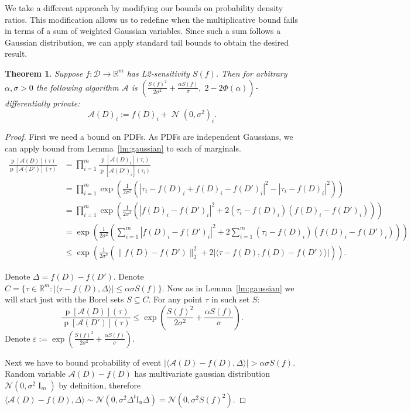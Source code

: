 \documentclass[12pt,letterpaper]{article}
\newcommand{\R}{\mathbb{R}}
\let\eps\varepsilon
\newcommand{\p}{\operatorname{p}}
\newtheorem{theorem}{Theorem}
\newcommand{\No}{\mathcal{N}}
\begin{document}
We take a different approach by modifying our bounds on probability density ratios. This modification allows us to redefine when the multiplicative bound fails in terms of a sum of weighted Gaussian variables. Since such a sum follows a Gaussian distribution, we can apply standard tail bounds to obtain the desired result.

\begin{theorem}
\label{tm:gaussian}
Suppose $f: \mathcal{D} \to \R^m$ has L2-sensitivity $S(f)$. Then for arbitrary $\alpha, \sigma > 0$ the following algorithm $\mathcal{A}$ is $\left(\tfrac{S(f)^2}{2\sigma^2} + \tfrac{\alpha S(f)}{\sigma},\; 2 - 2\Phi(\alpha)\right)$-differentially private:
$$\mathcal{A}(D)_i := f(D)_i + \operatorname{\No}(0, \sigma^2)_i.$$
\end{theorem}
\begin{proof}
First we need a bound on PDFs. As PDFs are independent Gaussians, we can apply bound from Lemma~\ref{lm:gaussian} to each of marginals.
\begin{align*}
  \frac{\p[\mathcal{A}(D)](\tau)}{\p[\mathcal{A}(D')](\tau)} 
  &= \prod_{i=1}^m\frac{\p[\mathcal{A}(D)_i](\tau_i)}{\p[\mathcal{A}(D')_i](\tau_i)} \\
  &= \prod_{i=1}^m\exp\left(\frac{1}{2\sigma^2}\left(|\tau_i - f(D)_i + f(D)_i - f(D')_i|^2 - |\tau_i - f(D)_i|^2\right)\right) \\
  &= \prod_{i=1}^m\exp\left(\frac{1}{2\sigma^2}\left(|f(D)_i - f(D')_i|^2 + 2(\tau_i - f(D)_i)(f(D)_i - f(D')_i)\right)\right) \\
  &= \exp\left(\frac{1}{2\sigma^2}\left(\sum_{i=1}^m|f(D)_i - f(D')_i|^2 + 2\sum_{i=1}^m(\tau_i - f(D)_i)(f(D)_i - f(D')_i)\right)\right) \\
  &\leq \exp\left(\frac{1}{2\sigma^2}\left(\|f(D) - f(D')\|_2^2 + 2\big|\langle\tau - f(D), f(D) - f(D')\rangle\big|\right)\right).
\end{align*}

Denote $\Delta = f(D) - f(D')$. Denote $C = \{\tau \in \R^m: |\langle \tau - f(D), \Delta\rangle| \leq \alpha\sigma S(f)\}$.
Now as in Lemma~\ref{lm:gaussian} we will start just with the Borel sets $S \subseteq C$. For any point $\tau$ in such set $S$:
$$\frac{\p[\mathcal{A}(D)](\tau)}{\p[\mathcal{A}(D')](\tau)} \leq \exp(\frac{S(f)^2}{2\sigma^2} + \frac{\alpha S(f)}{\sigma}).$$
Denote $\eps := \exp(\frac{S(f)^2}{2\sigma^2} + \frac{\alpha S(f)}{\sigma})$.

Next we have to bound probability of event $|\langle \mathcal{A}(D) - f(D), \Delta\rangle| > \alpha\sigma S(f)$.
Random variable $\mathcal{A}(D) - f(D)$ has multivariate gaussian distribution $\No(0, \sigma^2\operatorname{I}_m)$ by definition, therefore $\langle \mathcal{A}(D) - f(D), \Delta\rangle \sim \No(0, \sigma^2\Delta^t\operatorname{I_n}\Delta) = \No(0, \sigma^2S(f)^2)$.


\end{proof}
\end{document}
